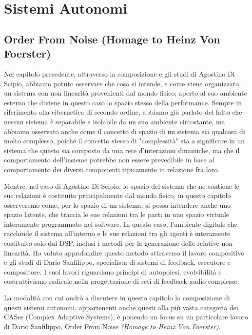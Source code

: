 \section{Sistemi Autonomi}
\label{sec:Sistemi Autonomi}

\subsection{Order From Noise (Homage to Heinz Von Foerster)}
\label{sec:Order From Noise (Homage to Heinz Von Foerster)}

Nel capitolo precedente, attraverso la composizione e gli studi di Agostino Di Scipio, 
abbiamo potuto osservare che cosa si intende, e come viene organizzato, 
un sistema con non linearità provenienti dal mondo fisico; aperto al suo ambiente esterno 
che diviene in questo caso lo spazio stesso della performance.
Sempre in riferimento alla cibernetica di secondo ordine,
abbiamo già parlato del fatto che nessun sistema è separabile e 
isolabile da un suo ambiente circostante, 
ma abbiamo osservato anche come il concetto di spazio di un sistema sia 
qualcosa di molto complesso, poiché il concetto stesso di "complessità"
sta a significare in un sistema che questo sia composto da una rete d'interazioni dinamiche, 
ma che il comportamento dell'insieme potrebbe non essere prevedibile in base al comportamento 
dei diversi componenti tipicamente in relazione fra loro.

Mentre, nel caso di Agostino Di Scipio, lo spazio del sistema che ne contiene le sue relazioni 
è costituito principalmente dal mondo fisico, 
in questo capitolo osserveremo come, per lo spazio di un sistema, 
si possa intendere anche uno spazio latente, 
che traccia le sue relazioni tra le parti in uno spazio virtuale interamente programmato nel software. 
In questo caso, l'ambiente digitale che racchiude il sistema all'interno e le sue relazioni 
tra gli agenti è interamente costituito solo dal DSP, 
inclusi i metodi per la generazione delle relative non linearità.
Ho voluto approfondire questo metodo attraverso il lavoro compositivo e gli studi di Dario Sanfilippo, 
specialista di sistemi di feedback, esecutore e compositore. 
I suoi lavori riguardano principi di autopoiesi, evolvibilità e costruttivismo radicale nella progettazione 
di reti di feedback audio complesse. 

La modalità con cui andrò a discutere in questo capitolo la composizione di questi
sistemi autonomi, appartenenti anche questi alla più vasta categoria dei CASes (Complex Adaptive Systems), 
è ponendo un focus su un particolare lavoro di Dario Sanfilippo, Order From Noise \textit{(Homage to Heinz Von Foerster)}.

